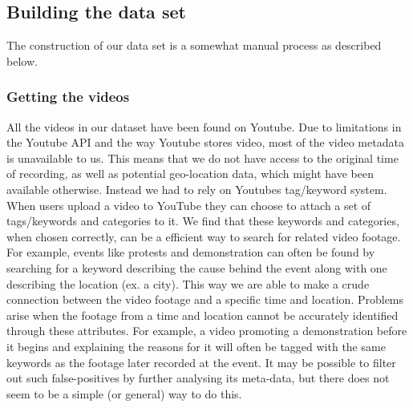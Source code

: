 \subsection{Building the data set}
%
The construction of our data set is a somewhat manual process as described below. %
%
\subsubsection{Getting the videos}
%
All the videos in our dataset have been found on Youtube. Due to limitations in the Youtube API and the way Youtube stores video, most of the video metadata is unavailable to us. This means that we do not have access to the original time of recording, as well as potential geo-location data, which might have been available otherwise. Instead we had to rely on Youtubes tag/keyword system. When users upload a video to YouTube they can choose to attach a set of tags/keywords and categories to it. We find that these keywords and categories, when chosen correctly, can be a efficient way to search for related video footage. For example, events like protests and demonstration can often be found by searching for a keyword describing the cause behind the event along with one describing the location (ex. a city). This way we are able to make a crude connection between the video footage and a specific time and location. Problems arise when the footage from a time and location cannot be accurately identified through these attributes. For example, a video promoting a demonstration before it begins and explaining the reasons for it will often be tagged with the same keywords as the footage later recorded at the event. It may be possible to filter out such false-positives by further analysing its meta-data, but there does not seem to be a simple (or general) way to do this.\\\\
%
%
